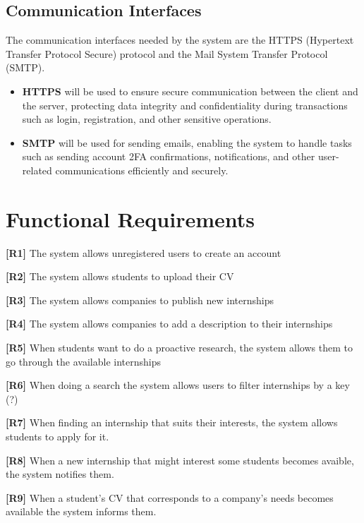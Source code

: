 \subsection{Communication Interfaces}
The communication interfaces needed by the system are the HTTPS (Hypertext Transfer Protocol Secure) protocol and the Mail System Transfer Protocol (SMTP). 

\begin{itemize}
    \item \textbf{HTTPS} will be used to ensure secure communication between the client and the server, protecting data integrity and confidentiality during transactions such as login, registration, and other sensitive operations.
    
    \item \textbf{SMTP} will be used for sending emails, enabling the system to handle tasks such as sending account 2FA confirmations, notifications, and other user-related communications efficiently and securely.

\end{itemize}

\section{Functional Requirements}

\textbf{[R1]} The system allows unregistered users to create an account

\textbf{[R2]} The system allows students to upload their CV

\textbf{[R3]} The system allows companies to publish new internships

\textbf{[R4]} The system allows companies to add a description to their internships

\textbf{[R5]} When students want to do a proactive research, the system allows them to go through the available internships

\textbf{[R6]} When doing a search the system allows users to filter internships by a key (?)

\textbf{[R7]} When finding an internship that suits their interests, the system allows students to apply for it. 

\textbf{[R8]} When a new internship that might interest some students becomes avaible, the system notifies them.

\textbf{[R9]} When a student's CV that corresponds to a company's needs becomes available the system informs them. 

